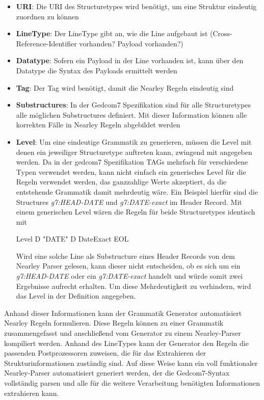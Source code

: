\begin{itemize}
	\item \textbf{URI}: Die URI des Structuretypes wird benötigt, um eine Struktur eindeutig zuordnen zu können 
	\item \textbf{LineType}: Der LineType gibt an, wie die Line aufgebaut ist (Cross-Reference-Identifier vorhanden? Payload vorhanden?)
	\item \textbf{Datatype}: Sofern ein Payload in der Line vorhanden ist, kann über den Datatype die Syntax des Payloads ermittelt werden
	\item \textbf{Tag}: Der Tag wird benötigt, damit die Nearley Regeln eindeutig sind
	\item \textbf{Substructures}: In der Gedcom7 Spezifikation sind für alle Structuretypes alle möglichen Substructures definiert. Mit dieser Information können alle korrekten Fälle in Nearley Regeln abgebildet werden
	\item \textbf{Level}: Um eine eindeutige Grammatik zu generieren, müssen die Level mit denen ein jeweiliger Structuretype auftreten kann, zwingend mit angegeben werden. Da in der gedcom7 Spezifikation TAGs mehrfach für verschiedene Typen verwendet werden, kann nicht einfach ein generisches Level für die Regeln verwendet werden, das ganzzahlige Werte akzeptiert, da die entstehende Grammatik damit mehrdeutig wäre. Ein Beispiel hierfür sind die Structures \textit{g7:HEAD-DATE} und \textit{g7:DATE-exact} im Header Record. Mit einem generischen Level wären die Regeln für beide Structuretypes identisch mit 
	\begin{center}
		Level  D  "DATE"  D  DateExact  EOL
	\end{center}
	Wird eine solche Line als Substructure eines Header Records von dem Nearley Parser gelesen, kann dieser nicht entscheiden, ob es sich um ein \textit{g7:HEAD-DATE} oder ein \textit{g7:DATE-exact} handelt und würde somit zwei Ergebnisse aufrecht erhalten. Um diese Mehrdeutigkeit zu verhindern, wird das Level in der Definition angegeben.
\end{itemize}
Anhand dieser Informationen kann der Grammatik Generator automatisiert Nearley Regeln formulieren. Diese Regeln können zu einer Grammatik zusammengefasst und anschließend vom Generator zu einem Nearley-Parser kompiliert werden. Anhand des LineTypes kann der Generator den Regeln die passenden Postprozessoren zuweisen, die für das Extrahieren der Strukturinformationen zuständig sind. Auf diese Weise kann ein voll funktionaler Nearley-Parser automatisiert generiert werden, der die Gedcom7-Syntax vollständig parsen und alle für die weitere Verarbeitung benötigten Informationen extrahieren kann. 


